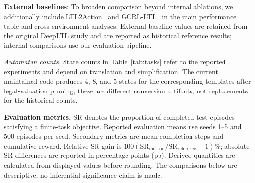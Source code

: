 \documentclass[journal]{IEEEtran}
\begin{document}
    \textbf{External baselines}: To broaden comparison beyond internal ablations, we additionally include LTL2Action~\citep{Vaezipoor2021} and GCRL-LTL~\citep{Qiu2023} in the main performance table and cross-environment analyses. External baseline values are retained from the original DeepLTL study and are reported as historical reference results; internal comparisons use our evaluation pipeline.

\begin{table}[htbp]
\centering
\caption{Task Evaluation Set}
\label{tab:tasks}
\end{table}
\noindent\textit{Automaton counts.} State counts in Table~\ref{tab:tasks} refer to the reported experiments and depend on translation and simplification. The current maintained code produces 4, 8, and 5 states for the corresponding templates after legal-valuation pruning; these are different conversion artifacts, not replacements for the historical counts.

	\textbf{Evaluation metrics.} SR denotes the proportion of completed test episodes satisfying a finite-task objective. Reported evaluation means use seeds 1--5 and 500 episodes per seed. Secondary metrics are mean completion steps and cumulative reward. Relative SR gain is $100(\mathrm{SR}_{\mathrm{method}}/\mathrm{SR}_{\mathrm{reference}}-1)\%$; absolute SR differences are reported in percentage points (pp). Derived quantities are calculated from displayed values before rounding. The comparisons below are descriptive; no inferential significance claim is made.
\end{document}
